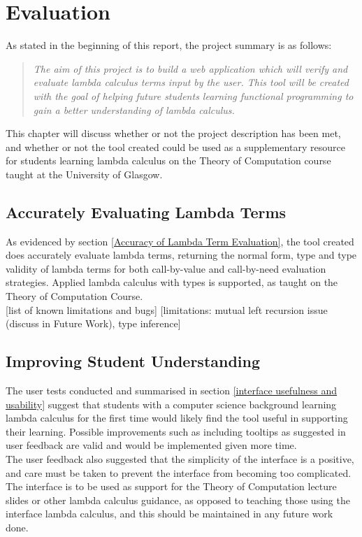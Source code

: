 \documentclass[a4paper,12pt]{report}
\begin{document}
\chapter{Evaluation}

As stated in the beginning of this report, the project summary is as follows:

\begin{quote}
	 \textit{The aim of this project is to build a web application which will verify and evaluate lambda calculus terms input by the user. This tool will be created with the goal of helping future students learning functional programming to gain a better understanding of lambda calculus.}
\end{quote}

This chapter will discuss whether or not the project description has been met, and whether or not the tool created could be used as a supplementary resource for students learning lambda calculus on the Theory of Computation course taught at the University of Glasgow.

\section{Accurately Evaluating Lambda Terms}
As evidenced by section \ref{Accuracy of Lambda Term Evaluation}, the tool created does accurately evaluate lambda terms, returning the normal form, type and type validity of lambda terms for both call-by-value and call-by-need evaluation strategies. Applied lambda calculus with types is supported, as taught on the Theory of Computation Course.\\

[list of known limitations and bugs]
[limitations: mutual left recursion issue (discuss in Future Work), type inference]

\section{Improving Student Understanding}
The user tests conducted and summarised in section \ref{interface usefulness and usability} suggest that students with a computer science background learning lambda calculus for the first time would likely find the tool useful in supporting their learning. Possible improvements such as including tooltips as suggested in user feedback are valid and would be implemented given more time.\\

The user feedback also suggested that the simplicity of the interface is a positive, and care must be taken to prevent the interface from becoming too complicated. The interface is to be used as support for the Theory of Computation lecture slides or other lambda calculus guidance, as opposed to teaching those using the interface lambda calculus, and this should be maintained in any future work done.\\
\end{document}
